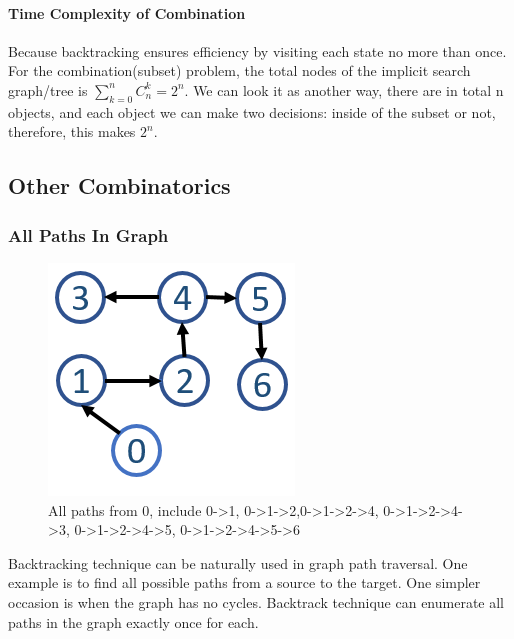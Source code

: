\documentclass[../main.tex]{subfiles}
\begin{document}
\paragraph{Time Complexity of Combination}
Because backtracking ensures efficiency by visiting each state no more than once. For the combination(subset) problem, the total nodes of the implicit search graph/tree is $\sum_{k=0}^{n}C_{n}^{k} =2^n$. We can look it as another way, there are in total n objects, and each object we can make two decisions: inside of the subset or not, therefore, this makes $2^n$. 

\subsection{Other Combinatorics}
\subsubsection{All Paths In Graph}
\label{subsec_all_paths}

\begin{figure}[ht!]
    \centering
    \includegraphics[width=0.4\columnwidth]{fig/all_paths.png}
    \caption{All paths from 0, include 0->1, 0->1->2,0->1->2->4, 0->1->2->4->3, 0->1->2->4->5, 0->1->2->4->5->6 }
    \label{fig:my_label}
\end{figure} 
Backtracking technique can be naturally used in graph path traversal. One example is to find all possible paths from a source to the target. One simpler occasion is when the graph has no cycles. Backtrack technique can enumerate all paths in the graph exactly once for each. 
\end{document}
